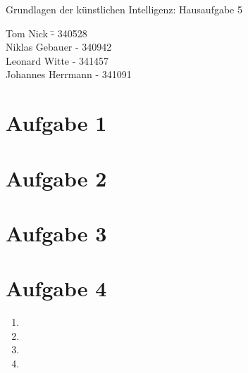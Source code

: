 \documentclass[a4paper,10pt]{article}
\begin{document}
\begin{center}
\Large{Grundlagen der künstlichen Intelligenz: Hausaufgabe 5} \\
\end{center}
\begin{tabbing}
Tom Nick \hspace{2cm}\= - 340528\\
Niklas Gebauer \> - 340942 \\
Leonard Witte \> - 341457 \\
Johannes Herrmann \> - 341091\\
\end{tabbing}

\section*{Aufgabe 1}
\section*{Aufgabe 2}
\section*{Aufgabe 3}
\section*{Aufgabe 4}
    \begin{enumerate}[~~a.)]
        \item
        \item
        \item
        \item
    \end{enumerate}
\end{document}
